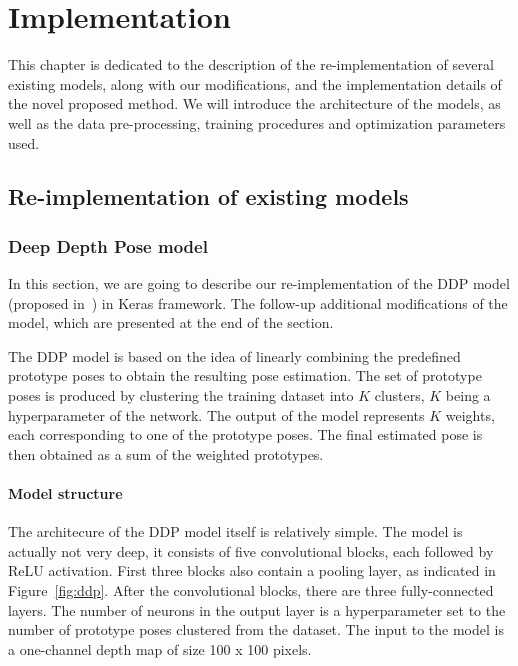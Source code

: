 \chapter{Implementation}\label{chap:implementation}
This chapter is dedicated to the description of the re-implementation of several existing models, along with our modifications, and the implementation details of the novel proposed method. We will introduce the architecture of the models, as well as the data pre-processing, training procedures and optimization parameters used.

\section{Re-implementation of existing models}

\subsection{Deep Depth Pose model}
In this section, we are going to describe our re-implementation of the DDP model (proposed in~\cite{Marin18jvcir}) in Keras framework. The follow-up additional modifications of the model, which are presented at the end of the section.\par
\vspace{5mm}
\noindent
The DDP model is based on the idea of linearly combining the predefined prototype poses to obtain the resulting pose estimation. The set of prototype poses is produced by clustering the training dataset into $K$ clusters, $K$ being a hyperparameter of the network. The output of the model represents $K$ weights, each corresponding to one of the prototype poses. The final estimated pose is then obtained as a sum of the weighted prototypes.


\subsubsection{Model structure}

The architecure of the DDP model itself is relatively simple. The model is actually not very deep, it consists of five convolutional blocks, each followed by ReLU activation. First three blocks also contain a pooling layer, as indicated in Figure~\ref{fig:ddp}. After the convolutional blocks, there are three fully-connected layers. The number of neurons in the output layer is a hyperparameter set to the number of prototype poses clustered from the dataset. The input to the model is a one-channel depth map of size 100 x 100 pixels.\par

